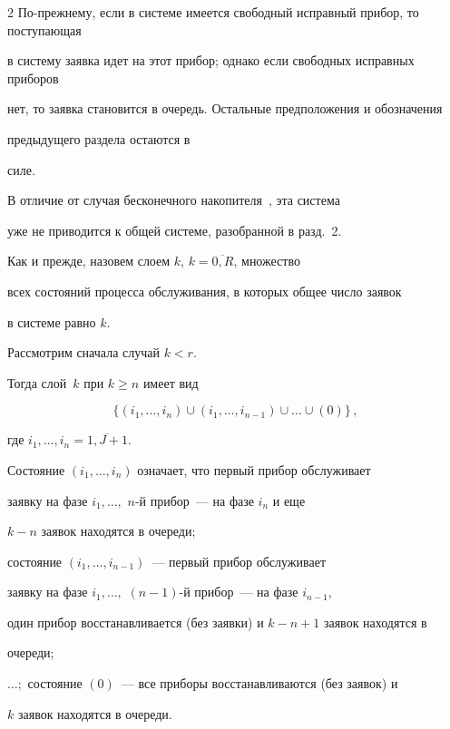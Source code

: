 \begin{multicols}{2}
По-прежнему, если в системе имеется свободный исправный прибор, то поступающая 


в систему заявка идет на этот прибор; однако если свободных исправных приборов 


нет, то заявка становится в очередь. Остальные предположения и обозначения 


предыдущего раздела остаются в %


силе.





В отличие от случая бесконечного накопителя~\cite{PSCh06}, эта система


уже не приводится к общей сис\-те\-ме, разобранной в разд.~2.





Как и прежде, назовем слоем $k$, $k=\overline{0,R}$, множество


всех состояний процесса обслуживания, в которых общее число заявок


в системе равно $k$.





Рассмотрим сначала случай $k<r$.


Тогда слой~$k$ при $k \geq n$ имеет вид


$$


\{(i_1,\ldots,i_n) \cup


(i_1,\ldots,i_{n-1})


\cup \ldots \cup (0)\}\,,


$$


где $i_1,\ldots,i_n=\overline{1,J+1}$.


Состояние $(i_1,\ldots,i_n)$ означает, что первый прибор обслуживает


заявку на фазе $i_1,\ldots,$ $n$-й прибор~--- на фазе $i_n$ и еще


$k-n$ заявок находятся в очереди;


состояние $(i_1,\ldots,i_{n-1})$~--- первый прибор обслуживает


заявку на фазе $i_1,\ldots,$ $(n{-}1)$-й прибор~--- на фазе $i_{n-1}$,


один прибор восстанавливается (без заявки) и $k-n+1$ заявок находятся в


очереди;


$\ldots;$ состояние $(0)$~--- все приборы восстанавливаются (без заявок) и


$k$ заявок находятся в очереди.



\end{multicols}
